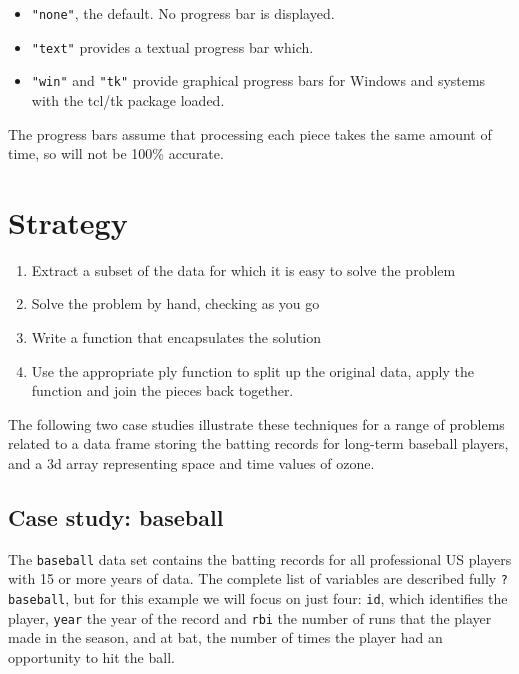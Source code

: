 \documentclass[letterpage]{scrartcl}
\begin{document}
\begin{itemize}
  \item {\tt "none"}, the default.  No progress bar is displayed.
  \item {\tt "text"} provides a textual progress bar which.
  \item {\tt "win"} and {\tt "tk"} provide graphical progress bars for Windows and systems with the tcl/tk package loaded.
\end{itemize}

The progress bars assume that processing each piece takes the same amount of time, so will not be 100\% accurate.

\section{Strategy}
\label{sec:strategy}



\begin{enumerate}
  \item Extract a subset of the data for which it is easy to solve the problem
  \item Solve the problem by hand, checking as you go
  \item Write a function that encapsulates the solution
  \item Use the appropriate ply function to split up the original data, apply the function and join the pieces back together.
  
\end{enumerate}

The following two case studies illustrate these techniques for a range of problems related to a data frame storing the batting records for long-term baseball players, and a 3d array representing space and time values of ozone.

\subsection{Case study: baseball}

The {\tt baseball} data set contains the batting records for all professional US players with 15 or more years of data.  The complete list of variables are described fully {\tt ?baseball}, but for this example we will focus on just four: {\tt id}, which identifies the player, {\tt year} the year of the record and {\tt rbi} the number of runs that the player made in the season, and {\tt} at bat, the number of times the player had an opportunity to hit the ball.
\end{document}

